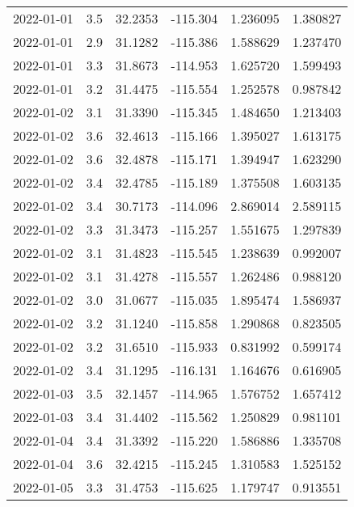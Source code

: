 \begin{tabular}{lrrrrr}
2022-01-01 &       3.5 &  32.2353 &  -115.304 &         1.236095 &         1.380827 \\
2022-01-01 &       2.9 &  31.1282 &  -115.386 &         1.588629 &         1.237470 \\
2022-01-01 &       3.3 &  31.8673 &  -114.953 &         1.625720 &         1.599493 \\
2022-01-01 &       3.2 &  31.4475 &  -115.554 &         1.252578 &         0.987842 \\
2022-01-02 &       3.1 &  31.3390 &  -115.345 &         1.484650 &         1.213403 \\
2022-01-02 &       3.6 &  32.4613 &  -115.166 &         1.395027 &         1.613175 \\
2022-01-02 &       3.6 &  32.4878 &  -115.171 &         1.394947 &         1.623290 \\
2022-01-02 &       3.4 &  32.4785 &  -115.189 &         1.375508 &         1.603135 \\
2022-01-02 &       3.4 &  30.7173 &  -114.096 &         2.869014 &         2.589115 \\
2022-01-02 &       3.3 &  31.3473 &  -115.257 &         1.551675 &         1.297839 \\
2022-01-02 &       3.1 &  31.4823 &  -115.545 &         1.238639 &         0.992007 \\
2022-01-02 &       3.1 &  31.4278 &  -115.557 &         1.262486 &         0.988120 \\
2022-01-02 &       3.0 &  31.0677 &  -115.035 &         1.895474 &         1.586937 \\
2022-01-02 &       3.2 &  31.1240 &  -115.858 &         1.290868 &         0.823505 \\
2022-01-02 &       3.2 &  31.6510 &  -115.933 &         0.831992 &         0.599174 \\
2022-01-02 &       3.4 &  31.1295 &  -116.131 &         1.164676 &         0.616905 \\
2022-01-03 &       3.5 &  32.1457 &  -114.965 &         1.576752 &         1.657412 \\
2022-01-03 &       3.4 &  31.4402 &  -115.562 &         1.250829 &         0.981101 \\
2022-01-04 &       3.4 &  31.3392 &  -115.220 &         1.586886 &         1.335708 \\
2022-01-04 &       3.6 &  32.4215 &  -115.245 &         1.310583 &         1.525152 \\
2022-01-05 &       3.3 &  31.4753 &  -115.625 &         1.179747 &         0.913551 \\

\end{tabular}
